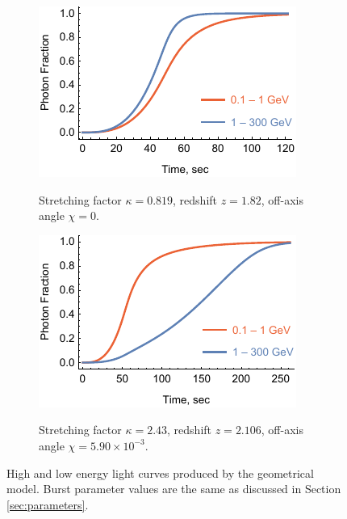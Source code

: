 \documentclass[manuscript]{aastex}
\begin{document}
	\begin{figure}
		\centering
		\hspace*{\fill}
		\begin{subfigure}{0.45\textwidth}
			\includegraphics[width=\textwidth]{sampleLightCurveLogNegative}
			\label{fig:sampleLightCurveLogNegative}
			\caption{Stretching factor $\kappa = 0.819$, redshift $z = 1.82$, off-axis angle $\chi = 0$.}
		\end{subfigure}
		\hfill
		\begin{subfigure}{0.45\textwidth}
			\includegraphics[width=\textwidth]{sampleLightCurveLogPositive}
			\label{fig:sampleLightCurveLogPosivie}
			\caption{Stretching factor $\kappa = 2.43$, redshift $z = 2.106$, off-axis angle $\chi = 5.90 \times 10^{-3}$.}
		\end{subfigure}
		\hspace*{\fill}
		\caption{
			High and low energy light curves produced by the geometrical model.
			Burst parameter values are the same as discussed in Section \ref{sec:parameters}.
		}
		\label{fig:sampleLightCurves}
	\end{figure}
\end{document}
